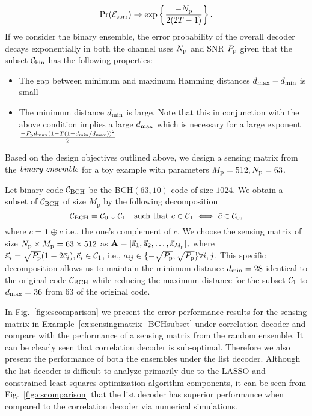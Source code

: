 \[
\mathrm{Pr}(\mathcal{E}_{\text{corr}})\rightarrow \exp\left\lbrace\frac{-N_{\mathrm{p}}}{2(2T-1)}\right\rbrace.
\]
 If we consider the binary ensemble, the error probability of the overall decoder decays exponentially in both the channel uses $N_{\mathrm{p}}$ and SNR $P_{\mathrm{p}}$ given that the subset $\mathcal{C}_{\text{bin}}$ has the following properties:
 \begin{itemize}
 \item The gap between minimum and maximum Hamming distances $d_{\mathrm{max}}-d_{\mathrm{min}}$ is small
 \item The minimum distance $d_{\mathrm{min}}$ is large. Note that this in conjunction with the above condition implies a large $d_{\mathrm{max}}$ which is necessary for a large exponent $\frac{-P_{\mathrm{p}}d_{\mathrm{max}} (1-T(1-d_{\mathrm{min}}/d_{\mathrm{max}}))^2}{2}$ %
 \end{itemize}
Based on the design objectives outlined above, we design a sensing matrix from the $\emph{binary ensemble}$ for a toy example with parameters $M_{\mathrm{p}}=512,N_{\mathrm{p}}=63$.
\begin{example}
\label{ex:sensingmatrix_BCHsubset}
Let binary code $\mathcal{C}_{\text{BCH}}$ be the BCH$(63,10)$ code of size $1024$. We obtain a subset of $\mathcal{C}_{\text{BCH}}$ of size $M_\mathrm{p}$ by the following decomposition
\[
\mathcal{C}_{\text{BCH}}=\mathcal{C}_0\cup \mathcal{C}_1 ~~\text{ such that } c\in \mathcal{C}_1 \iff \bar{c}\in\mathcal{C}_0,
\]
where $\bar{c}=\mathbf{1}\oplus c$ i.e., the one's complement of $c$. We choose the sensing matrix of size $N_{\mathrm{p}} \times M_{\mathrm{p}}=63\times 512$ as $\mathbf{A}=[\vec{\mathrm{a}}_1,\vec{\mathrm{a}}_2,\ldots,\vec{\mathrm{a}}_{M_\mathrm{p}}],$ where $\vec{\mathrm{a}}_i=\sqrt{P_{\mathrm{p}}}(1-2\vec{\mathrm{c}}_i), \vec{\mathrm{c}}_i\in\mathcal{C}_1$, i.e., $a_{ij}\in\{-\sqrt{P_{\mathrm{p}}},\sqrt{P_{\mathrm{p}}}\} \forall i,j$. This specific decomposition allows us to maintain the minimum distance $d_{\mathrm{min}}=28$ identical to the original code $\mathcal{C}_{\text{BCH}}$ while reducing the maximum distance for the subset $\mathcal{C}_1$ to $d_{\mathrm{max}}=36$ from $63$ of the original code.
\end{example}
 In Fig.~\ref{fig:cscomparison} we present the error performance results for the sensing matrix in Example~\ref{ex:sensingmatrix_BCHsubset} under correlation decoder and compare with the performance of a sensing matrix from the random ensemble. It can be clearly seen that correlation decoder is sub-optimal. Therefore we also present the performance of both the ensembles under the list decoder. Although the list decoder is difficult to analyze primarily due to the LASSO and constrained least squares optimization algorithm components, it can be seen from Fig.~\ref{fig:cscomparison} that the list decoder has superior performance when compared to the correlation decoder via numerical simulations.

